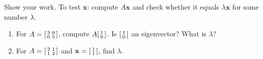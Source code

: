 \documentclass[10pt]{article}
\newcommand{\xx}{\mathbf{x}}
\begin{document}
\begin{practicebox}
Show your work. To test $\xx$: compute $A\xx$ and check whether it equals $\lambda\xx$ for some number $\lambda$.
\begin{enumerate}[leftmargin=1.6em, itemsep=4pt]
  \item For $A=\begin{bsmallmatrix} 3 & 0\\ 0 & 5 \end{bsmallmatrix}$, compute $A\begin{bsmallmatrix} 1\\ 0 \end{bsmallmatrix}$. Is $\begin{bsmallmatrix} 1\\ 0 \end{bsmallmatrix}$ an eigenvector? What is $\lambda$? 
  \item For $A=\begin{bsmallmatrix} 2 & 1\\ 1 & 2 \end{bsmallmatrix}$ and $\xx=\begin{bsmallmatrix} 1\\ 1 \end{bsmallmatrix}$, find $\lambda$. \ansline{$A\xx=\begin{bsmallmatrix} 3\\3 \end{bsmallmatrix}=3\begin{bsmallmatrix} 1\\1 \end{bsmallmatrix}$, so $\lambda=3$.}

\end{enumerate}
\end{practicebox}
\end{document}
